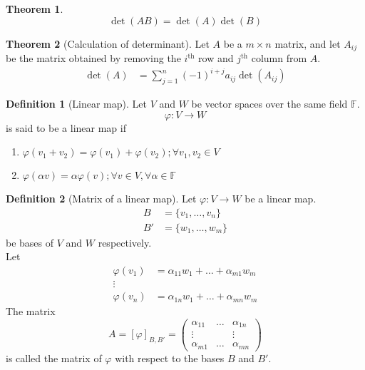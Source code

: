 \documentclass[fleqn, a5paper, 10pt]{amsart}
\theoremstyle{definition}
\newtheorem{definition}{Definition} %
\theoremstyle{theorem}
\newtheorem{theorem}{Theorem} %
\theoremstyle{remark}
\numberwithin{corollary}{theorem}
\numberwithin{equation}{theorem}
\begin{document}
\begin{theorem}
	\begin{equation*}
		\det (A B) = \det (A) \det (B)
	\end{equation*}
\end{theorem}

\begin{theorem}[Calculation of determinant]
	Let $A$ be a $m \times n$ matrix, and let $A_{ij}$ be the matrix obtained by removing the $i^{\text{th}}$ row and $j^{\text{th}}$ column from $A$.
	\begin{align*}
		\det (A) &= \sum_{j = 1}^{n} (-1)^{i + j} a_{ij} \det (A_{ij})
	\end{align*}
\end{theorem}

\begin{definition}[Linear map]
	Let $V$ and $W$ be vector spaces over the same field $\mathbb{F}$. 
	\begin{equation*}
		\varphi : V \to W
	\end{equation*}
	is said to be a linear map if
	\begin{enumerate}
		\item $\varphi(v_1 + v_2) = \varphi(v_1) + \varphi(v_2) ; \forall v_1, v_2 \in V$
		\item $\varphi(\alpha v) = \alpha \varphi(v) ; \forall v \in V, \forall \alpha \in \mathbb{F}$
	\end{enumerate}
\end{definition}

\begin{definition}[Matrix of a linear map]
	Let $\varphi : V \to W$ be a linear map.
	\begin{align*}
		B &= \{v_1, \dots, v_n\}\\
		B' &= \{w_1, \dots, w_m\}
	\end{align*}
	be bases of $V$ and $W$ respectively.\\
	Let 
	\begin{align*}
		\varphi (v_1) &= \alpha_{11} w_{1} + \dots + \alpha_{m1} w_{m}\\
		\vdots\\
		\varphi (v_n) &= \alpha_{1n} w_{1} + \dots + \alpha_{mn} w_{m}
	\end{align*}
	The matrix
	\begin{equation*}
		A = [\varphi]_{B, B'} =
		\begin{pmatrix}
			\alpha_{11} & \dots & \alpha_{1n}\\
			\vdots & & \vdots\\
			\alpha_{m1} & \dots & \alpha_{mn}
		\end{pmatrix}
	\end{equation*}
	is called the matrix of $\varphi$ with respect to the bases $B$ and $B'$.
\end{definition}
\end{document}
